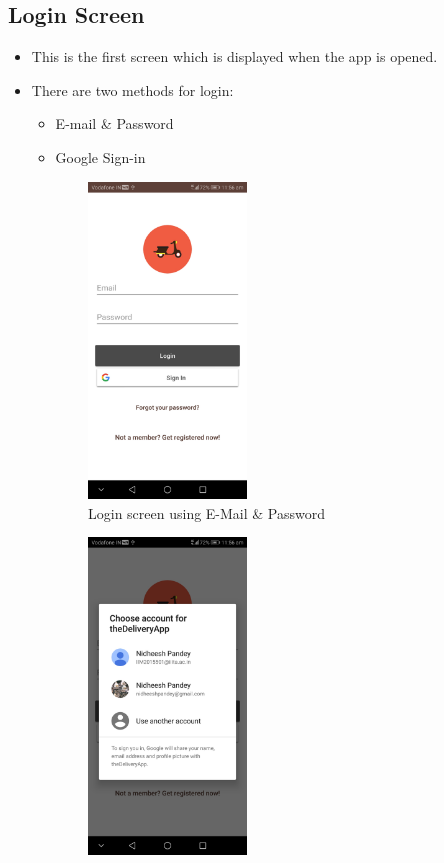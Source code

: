 \documentclass{report}
\begin{document}
\subsection{Login Screen}
\begin{itemize}
\item This is the first screen which is displayed when the app is opened.
\item There are two methods for login:
\begin{itemize}[label=$\rightarrow$]
\item E-mail \& Password
\item Google Sign-in
\end{itemize}
\end{itemize}

\begin{figure}[h!]
\begin{subfigure}[b]{.26\textwidth}
\centering
\includegraphics[width=4.2cm]{login.jpg}
\caption{\centering Login screen using E-Mail \& Password}
\end{subfigure}
\begin{subfigure}[b]{.26\textwidth}
\centering
\includegraphics[width=4.2cm]{google_signin.jpg}

\end{subfigure}
\end{figure}
\end{document}
